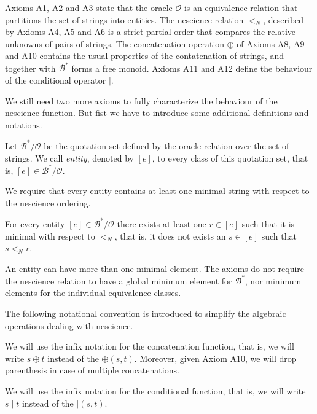 Axioms A1, A2 and A3 state that the oracle $\mathcal{O}$ is an equivalence relation that partitions the set of strings into entities. The nescience relation $<_N$, described by Axioms A4, A5 and A6 is a strict partial order that compares the relative unknowns of pairs of strings. The concatenation operation $\oplus$ of Axioms A8, A9 and A10 contains the usual properties of the contatenation of strings, and together with $\mathcal{B}^\ast$ forms a free monoid. Axioms A11 and A12 define the behaviour of the conditional operator $\mid$. 

We still need two more axioms to fully characterize the behaviour of the nescience function. But fist we have to introduce some additional definitions and notations.

\begin{definition}
Let $\mathcal{B}^\ast / \mathcal{O}$ be the quotation set defined by the oracle relation over the set of strings. We call \emph{entity}, denoted by $[e]$, to every class of this quotation set, that is, $[e] \in \mathcal{B}^\ast / \mathcal{O}$.
\end{definition}

We require that every entity contains at least one minimal string with respect to the nescience ordering.

\begin{definition}[Axiom A13]
For every entity $[e] \in \mathcal{B}^\ast / \mathcal{O}$ there exists at least one $r \in [e]$ such that it is minimal with respect to $<_N$, that is, it does not exists an $s \in [e]$ such that $s <_N r$.
\end{definition}

An entity can have more than one minimal element. The axioms do not require the nescience relation to have a global minimum element for $\mathcal{B}^\ast$, nor minimum elements for the individual equivalence classes.

The following notational convention is introduced to simplify the algebraic operations dealing with nescience.

\begin{notation}
We will use the infix notation for the concatenation function, that is, we will write $s \oplus t$ instead of the $\oplus(s, t)$. Moreover, given Axiom A10, we will drop parenthesis in case of multiple concatenations.

We will use the infix notation for the conditional function, that is, we will write $s \mid t$ instead of the $\mid(s, t)$.
\end{notation}

